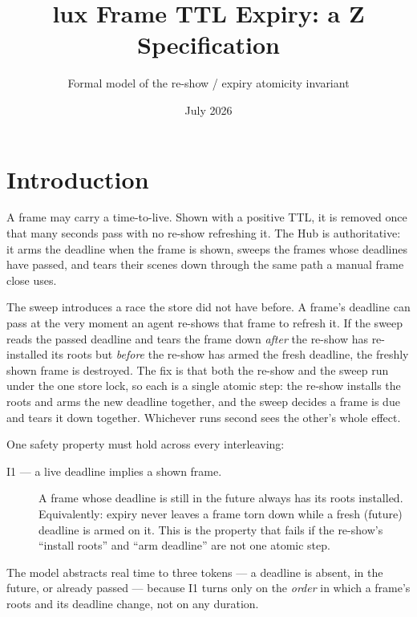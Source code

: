 \documentclass[a4paper,10pt,fleqn]{article}
\begin{document}
\title{lux Frame TTL Expiry: a Z Specification}
\author{Formal model of the re-show / expiry atomicity invariant}
\date{July 2026}
\maketitle

\section{Introduction}

A frame may carry a time-to-live. Shown with a positive TTL, it is removed once
that many seconds pass with no re-show refreshing it. The Hub is authoritative:
it arms the deadline when the frame is shown, sweeps the frames whose deadlines
have passed, and tears their scenes down through the same path a manual frame
close uses.

The sweep introduces a race the store did not have before. A frame's deadline can
pass at the very moment an agent re-shows that frame to refresh it. If the sweep
reads the passed deadline and tears the frame down \emph{after} the re-show has
re-installed its roots but \emph{before} the re-show has armed the fresh deadline,
the freshly shown frame is destroyed. The fix is that both the re-show and the
sweep run under the one store lock, so each is a single atomic step: the re-show
installs the roots and arms the new deadline together, and the sweep decides a
frame is due and tears it down together. Whichever runs second sees the other's
whole effect.

One safety property must hold across every interleaving:

\begin{description}
  \item[I1 --- a live deadline implies a shown frame.] A frame whose deadline is
    still in the future always has its roots installed. Equivalently: expiry never
    leaves a frame torn down while a fresh (future) deadline is armed on it. This is
    the property that fails if the re-show's ``install roots'' and ``arm deadline''
    are not one atomic step.
\end{description}

The model abstracts real time to three tokens --- a deadline is absent, in the
future, or already passed --- because I1 turns only on the \emph{order} in which a
frame's roots and its deadline change, not on any duration.
\end{document}
